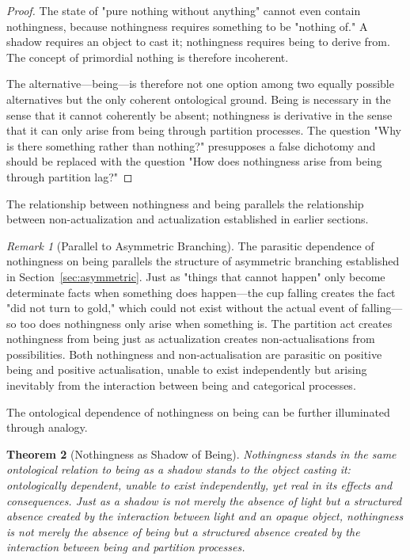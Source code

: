\documentclass[12pt,a4paper]{article}
\newtheorem{theorem}{Theorem}[section]
\theoremstyle{definition}
\theoremstyle{remark}
\newtheorem{remark}[theorem]{Remark}
\begin{document}
\begin{proof}
The state of "pure nothing without anything" cannot even contain nothingness, because nothingness requires something to be "nothing of." A shadow requires an object to cast it; nothingness requires being to derive from. The concept of primordial nothing is therefore incoherent.

The alternative—being—is therefore not one option among two equally possible alternatives but the only coherent ontological ground. Being is necessary in the sense that it cannot coherently be absent; nothingness is derivative in the sense that it can only arise from being through partition processes. The question "Why is there something rather than nothing?" presupposes a false dichotomy and should be replaced with the question "How does nothingness arise from being through partition lag?"
\end{proof}

The relationship between nothingness and being parallels the relationship between non-actualization and actualization established in earlier sections.

\begin{remark}[Parallel to Asymmetric Branching]
\label{rem:parallel_branching}
The parasitic dependence of nothingness on being parallels the structure of asymmetric branching established in Section~\ref{sec:asymmetric}. Just as "things that cannot happen" only become determinate facts when something does happen—the cup falling creates the fact "did not turn to gold," which could not exist without the actual event of falling—so too does nothingness only arise when something is. The partition act creates nothingness from being just as actualization creates non-actualisations from possibilities. Both nothingness and non-actualisation are parasitic on positive being and positive actualisation, unable to exist independently but arising inevitably from the interaction between being and categorical processes.
\end{remark}

The ontological dependence of nothingness on being can be further illuminated through analogy.

\begin{theorem}[Nothingness as Shadow of Being]
\label{thm:nothingness_shadow}
Nothingness stands in the same ontological relation to being as a shadow stands to the object casting it: ontologically dependent, unable to exist independently, yet real in its effects and consequences. Just as a shadow is not merely the absence of light but a structured absence created by the interaction between light and an opaque object, nothingness is not merely the absence of being but a structured absence created by the interaction between being and partition processes.
\end{theorem}
\end{document}
